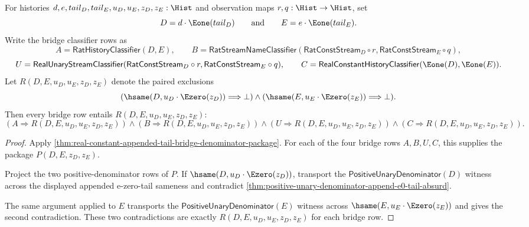\begin{theorem}
\label{thm:real-constant-appended-tail-bridge-appended-ezero-exclusion}
For histories $d,e,tail_D,tail_E,u_D,u_E,z_D,z_E:\Hist$ and observation maps
$r,q:\Hist\to\Hist$, set
$$
D=d\cdot\Eone(tail_D)
\qquad\text{and}\qquad
E=e\cdot\Eone(tail_E).
$$
Write the bridge classifier rows as
$$
A=\mathsf{RatHistoryClassifier}(D,E),
\qquad
B=\mathsf{RatStreamNameClassifier}(\mathsf{RatConstStream}_D\circ r,
\mathsf{RatConstStream}_E\circ q),
$$
$$
U=\mathsf{RealUnaryStreamClassifier}(\mathsf{RatConstStream}_D\circ r,
\mathsf{RatConstStream}_E\circ q),
\qquad
C=\mathsf{RealConstantHistoryClassifier}(\Eone(D),\Eone(E)).
$$
Let $R(D,E,u_D,u_E,z_D,z_E)$ denote the paired exclusions
$$
(\hsame(D,u_D\cdot\Ezero(z_D))\Longrightarrow\bot)\land
(\hsame(E,u_E\cdot\Ezero(z_E))\Longrightarrow\bot).
$$
Then every bridge row entails $R(D,E,u_D,u_E,z_D,z_E)$:
$$
(A\Longrightarrow R(D,E,u_D,u_E,z_D,z_E))\land
(B\Longrightarrow R(D,E,u_D,u_E,z_D,z_E))\land
(U\Longrightarrow R(D,E,u_D,u_E,z_D,z_E))\land
(C\Longrightarrow R(D,E,u_D,u_E,z_D,z_E)).
$$
\end{theorem}
\begin{proof}
Apply
\autoref{thm:real-constant-appended-tail-bridge-denominator-package}. For each
of the four bridge rows $A,B,U,C$, this supplies the package
$P(D,E,z_D,z_E)$.

Project the two positive-denominator rows of $P$. If
$\hsame(D,u_D\cdot\Ezero(z_D))$, transport the
$\mathsf{PositiveUnaryDenominator}(D)$ witness across the displayed appended
e-zero-tail sameness and contradict
\autoref{thm:positive-unary-denominator-append-e0-tail-absurd}.

The same argument applied to $E$ transports the
$\mathsf{PositiveUnaryDenominator}(E)$ witness across
$\hsame(E,u_E\cdot\Ezero(z_E))$ and gives the second contradiction. These two
contradictions are exactly $R(D,E,u_D,u_E,z_D,z_E)$ for each bridge row.
\end{proof}

